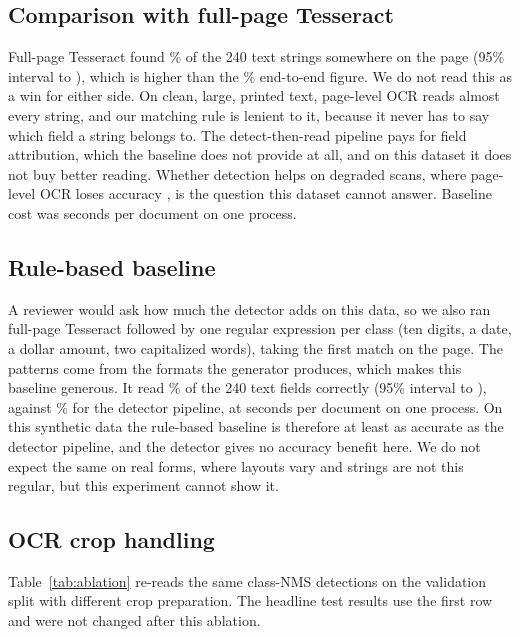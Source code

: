 \subsection{Comparison with full-page Tesseract}
Full-page Tesseract found \valBaseCapture\% of the 240 text strings somewhere on the page (95\% interval \valBaseLo{} to \valBaseHi), which is higher than the \valNmsEndToEnd\% end-to-end figure. We do not read this as a win for either side. On clean, large, printed text, page-level OCR reads almost every string, and our matching rule is lenient to it, because it never has to say which field a string belongs to. The detect-then-read pipeline pays for field attribution, which the baseline does not provide at all, and on this dataset it does not buy better reading. Whether detection helps on degraded scans, where page-level OCR loses accuracy \cite{thammarak2022,reisswig2019}, is the question this dataset cannot answer. Baseline cost was \valBaseSecPerDoc{} seconds per document on one process.

\subsection{Rule-based baseline}
A reviewer would ask how much the detector adds on this data, so we also ran full-page Tesseract followed by one regular expression per class (ten digits, a date, a dollar amount, two capitalized words), taking the first match on the page. The patterns come from the formats the generator produces, which makes this baseline generous. It read \valRuleAcc\% of the 240 text fields correctly (95\% interval \valRuleLo{} to \valRuleHi), against \valNmsEndToEnd\% for the detector pipeline, at \valRuleSecPerDoc{} seconds per document on one process. On this synthetic data the rule-based baseline is therefore at least as accurate as the detector pipeline, and the detector gives no accuracy benefit here. We do not expect the same on real forms, where layouts vary and strings are not this regular, but this experiment cannot show it.

\subsection{OCR crop handling}\label{sec:ablation}
Table~\ref{tab:ablation} re-reads the same class-NMS detections on the validation split with different crop preparation. The headline test results use the first row and were not changed after this ablation.

